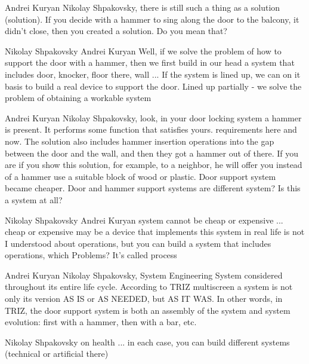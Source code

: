 \documentclass[11pt,a4paper]{article}
\begin{document}
Andrei Kuryan Nikolay Shpakovsky, there is still such a thing as a solution
(solution). If you decide with a hammer to sing along the door to the balcony,
it didn’t close, then you created a solution. Do you mean that?

Nikolay Shpakovsky Andrei Kuryan Well, if we solve the problem of how to
support the door with a hammer, then we first build in our head a system that
includes door, knocker, floor there, wall ... If the system is lined up, we
can on it basis to build a real device to support the door. Lined up partially
- we solve the problem of obtaining a workable system

Andrei Kuryan Nikolay Shpakovsky, look, in your door locking system a hammer
is present. It performs some function that satisfies yours.  requirements here
and now. The solution also includes hammer insertion operations into the gap
between the door and the wall, and then they got a hammer out of there. If you
are if you show this solution, for example, to a neighbor, he will offer you
instead of a hammer use a suitable block of wood or plastic. Door support
system became cheaper. Door and hammer support systems are different system?
Is this a system at all?

Nikolay Shpakovsky Andrei Kuryan system cannot be cheap or expensive ...
cheap or expensive may be a device that implements this system in real life is
not I understood about operations, but you can build a system that includes
operations, which Problems? It’s called process

Andrei Kuryan Nikolay Shpakovsky, System Engineering System considered
throughout its entire life cycle. According to TRIZ multiscreen a system is
not only its version AS IS or AS NEEDED, but AS IT WAS. In other words, in
TRIZ, the door support system is both an assembly of the system and system
evolution: first with a hammer, then with a bar, etc.

Nikolay Shpakovsky on health ... in each case, you can build different systems
(technical or artificial there)
\end{document}
